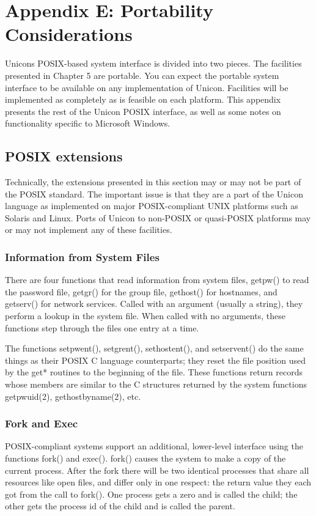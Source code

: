 \clearpage\section{Appendix E: Portability Considerations}

Unicon{\textquotesingle}s POSIX-based system interface is divided into
two pieces. The facilities presented in Chapter 5 are portable. You can
expect the portable system interface to be available on any
implementation of Unicon. Facilities will be implemented as completely
as is feasible on each platform. This appendix presents the rest of the
Unicon POSIX interface, as well as some notes on functionality specific
to Microsoft Windows.

\subsection[POSIX extensions]{POSIX extensions}

Technically, the extensions presented in this
section may or may not be part of the POSIX standard. The important
issue is that they are a part of the Unicon language as implemented on
major POSIX-compliant UNIX platforms such as Solaris and Linux. Ports
of Unicon to non-POSIX or quasi-POSIX platforms may or may not
implement any of these facilities.

\subsubsection{Information from System Files}

There are four functions that read information from system files,
getpw() to read the password file, getgr() for the group file,
gethost() for hostnames, and getserv() for network services. Called
with an argument (usually a string), they perform a lookup in the
system file. When called with no arguments, these functions step
through the files one entry at a time.

The functions setpwent(), setgrent(), sethostent(), and setservent() do
the same things as their POSIX C language counterparts; they reset the
file position used by the get* routines to the beginning of the file.
These functions return records whose members are similar to the C
structures returned by the system functions getpwuid(2),
gethostbyname(2), etc.

\subsubsection{Fork and Exec}
POSIX-compliant systems support an additional, lower-level interface
using the functions fork() and exec(). fork() causes the
system to make a copy of the current process. After the fork there will
be two identical processes that share all resources like open files,
and differ only in one respect: the return value they each got from the
call to fork(). One process gets a zero and is called the child; the
other gets the process id of the child and is called the parent.

